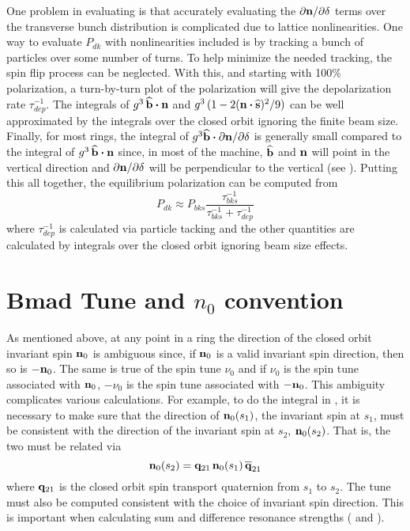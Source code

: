 One problem in evaluating  is that accurately evaluating the $\partial{\bf n}/\partial\delta$
terms over the transverse bunch distribution is complicated due to lattice nonlinearities. One way
to evaluate $P_{dk}$ with nonlinearities included is by tracking a bunch of particles over some
number of turns. To help minimize the needed tracking, the spin flip process can be neglected. With
this, and starting with 100\% polarization, a turn-by-turn plot of the polarization will give the
depolarization rate $\tau_{dep}^{-1}$. The integrals of $g^3 \, \widehat{{\bf b}} \mathbin{\boldsymbol{\cdot}} {\bf n}$ and $g^3
\, (1 - 2({\bf n} \mathbin{\boldsymbol{\cdot}} \widehat{{\bf s}})^2/9)$ can be well approximated by the integrals over the
closed orbit ignoring the finite beam size.  Finally, for most rings, the integral of $g^3 \widehat{{\bf b}}
\mathbin{\boldsymbol{\cdot}} \partial{\bf n}/\partial\delta$ is generally small compared to the integral of $g^3 \,
\widehat{{\bf b}} \mathbin{\boldsymbol{\cdot}} {\bf n}$ since, in most of the machine, $\widehat{{\bf b}}$ and ${\bf n}$ will point in the
vertical direction and $\partial{\bf n}/\partial\delta$ will be perpendicular to the vertical (see
).  Putting this all together, the equilibrium polarization can be computed from
\begin{equation}
  P_{dk} \approx P_{bks} \frac{\tau_{bks}^{-1}}{\tau_{bks}^{-1} + \tau_{dep}^{-1}}
\end{equation}
where $\tau_{dep}^{-1}$ is calculated via particle tacking and the other quantities are calculated by
integrals over the closed orbit ignoring beam size effects.

\section{Bmad Tune and $n_0$ convention}
\label{s:spin.tune}

As mentioned above, at any point in a ring the direction of the closed orbit invariant spin ${\bf n}_0$
is ambiguous since, if ${\bf n}_0$ is a valid invariant spin direction, then so is $-{\bf n}_0$. The same
is true of the spin tune $\nu_0$ and if $\nu_0$ is the spin tune associated with ${\bf n}_0$, $-\nu_0$
is the spin tune associated with $-{\bf n}_0$. This ambiguity complicates various calculations. For
example, to do the integral in , it is necessary to make sure that the direction of
${\bf n}_0(s_1)$, the invariant spin at $s_1$, must be consistent with the direction of the invariant
spin at $s_2$, ${\bf n}_0(s_2)$. That is, the two must be related via
\begin{equation}
  \bfn_0(s_2) = \bfq_{21} \, \bfn_0(s_1) \, \BAR\bfq_{21}
  \label{n0qn0q}
\end{equation}
where ${\bf q}_{21}$ is the closed orbit spin transport quaternion from $s_1$ to $s_2$. The tune must
also be computed consistent with the choice of invariant spin direction. This is important when
calculating sum and difference resonance strengths ( and ).

